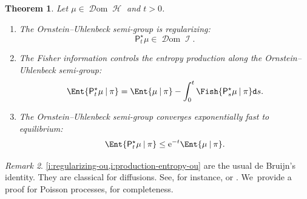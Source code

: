 \documentclass[10pt]{amsart}
\newtheorem{theorem}{Theorem}[section]
\theoremstyle{definition}
\theoremstyle{remark}
\newtheorem{remark}[theorem]{Remark}
\newcommand{\given}[1][]{%
\nonscript\:#1\vert
\allowbreak
\nonscript\:
\mathopen{}}
\DeclareMathOperator{\ent}{\mathcal{H}}
\DeclareMathOperator{\fish}{\mathcal{I}}
\DeclareMathOperator{\dom}{\mathscr{D}om}
\begin{document}
\begin{theorem}\label{t:properties-ou}
Let $\mu \in \dom \ent$ and $t > 0$.
\begin{enumerate}[$(\rm i)$, wide]
\item\label{i:regularizing-ou} The Ornstein--Uhlenbeck semi-group is regularizing:
\begin{equation}\label{e:regularizing-ou}
\mathsf{P}^{\star}_{t}\mu \in \dom \fish.
\end{equation}
\item\label{i:production-entropy-ou} The Fisher information controls the entropy production along the Ornstein--Uhlenbeck semi-group:
\begin{equation}\label{e:production-entropy-ou}
\Ent{\mathsf{P}^{\star}_{t}\mu \given \pi} = \Ent{\mu \given \pi} - \int_{0}^{t} \Fish{\mathsf{P}^{\star}_{s} \mu \given \pi} \mathtt{d} s.
\end{equation}
\item\label{i:exponential-convergence-entropy} The Ornstein--Uhlenbeck semi-group converges exponentially fast to equilibrium:
\begin{equation}\label{e:exponential-convergence-entropy}
\Ent{\mathsf{P}^{\star}_{t} \mu \given \pi} \leq \mathrm{e}^{-t} \Ent{\mu \given \pi}.
\end{equation}
\end{enumerate}
\end{theorem}

\begin{remark}
\cref{i:regularizing-ou,i:production-entropy-ou} are the usual de Bruijn's identity.
They are classical for diffusions.
See, for instance, \cite[Prop.\,5.2.2]{BGL} or \cite[Th.\,4.16]{AGSHeat}. We~provide a proof for Poisson processes, for completeness.
\end{remark}
\end{document}
